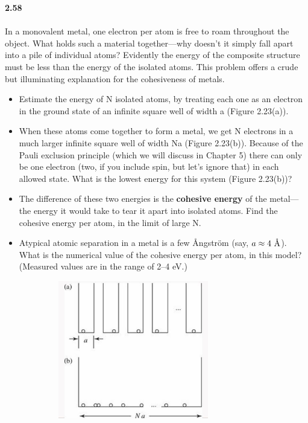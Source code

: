 \documentclass[fleqn]{article}
\begin{document}
  \textbf{2.58} \\ \\
  In a monovalent metal, one electron per atom is free to roam
  throughout the object. What holds such a material together—why doesn’t it
  simply fall apart into a pile of individual atoms? Evidently the energy of the
  composite structure must be less than the energy of the isolated atoms. This
  problem offers a crude but illuminating explanation for the cohesiveness of
  metals.
  \begin{itemize}
    \item Estimate the energy of N isolated atoms, by treating each one as an
    electron in the ground state of an infinite square well of width a
    (Figure 2.23(a)).
    
    \item When these atoms come together to form a metal, we get N electrons in a
    much larger infinite square well of width Na (Figure 2.23(b)). Because of
    the Pauli exclusion principle (which we will discuss in Chapter 5) there
    can only be one electron (two, if you include spin, but let’s ignore that) in
    each allowed state. What is the lowest energy for this system
    (Figure 2.23(b))?

    \item The difference of these two energies is the \textbf{cohesive energy} of the metal—
    the energy it would take to tear it apart into isolated atoms. Find the
    cohesive energy per atom, in the limit of large N.


    \item Atypical atomic separation in a metal is a few Ångström (say, $a \approx 4 ~ \mbox{\normalfont\AA}$).
    What is the numerical value of the cohesive energy per atom, in this
    model? (Measured values are in the range of 2–4 eV.)

    \includegraphics[height=6cm, width=10cm]{one.JPG}
    
  \end{itemize}


  
\end{document}
